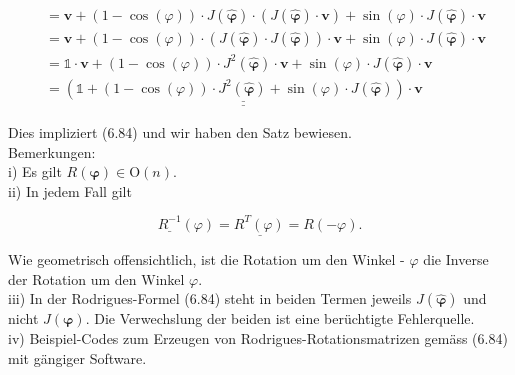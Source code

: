 \documentclass[10pt]{article}
\begin{document}
\begin{align*}
& =\mathbf{v}+(1-\cos (\varphi)) \cdot J(\hat{\boldsymbol{\varphi}}) \cdot(J(\hat{\boldsymbol{\varphi}}) \cdot \mathbf{v})+\sin (\varphi) \cdot J(\hat{\boldsymbol{\varphi}}) \cdot \mathbf{v} \\
& =\mathbf{v}+(1-\cos (\varphi)) \cdot(J(\hat{\boldsymbol{\varphi}}) \cdot J(\hat{\boldsymbol{\varphi}})) \cdot \mathbf{v}+\sin (\varphi) \cdot J(\hat{\boldsymbol{\varphi}}) \cdot \mathbf{v} \\
& =\mathbb{1} \cdot \mathbf{v}+(1-\cos (\varphi)) \cdot J^{2}(\hat{\boldsymbol{\varphi}}) \cdot \mathbf{v}+\sin (\varphi) \cdot J(\hat{\boldsymbol{\varphi}}) \cdot \mathbf{v} \\
& =\underline{\underline{\left(\mathbb{1}+(1-\cos (\varphi)) \cdot J^{2}(\hat{\boldsymbol{\varphi}})+\sin (\varphi) \cdot J(\hat{\boldsymbol{\varphi}})\right) \cdot \mathbf{v}}} \tag{6.87}
\end{align*}


Dies impliziert (6.84) und wir haben den Satz bewiesen.\\
Bemerkungen:\\
i) Es gilt $R(\boldsymbol{\varphi}) \in \mathrm{O}(n)$.\\
ii) In jedem Fall gilt


\begin{equation*}
\underline{\underline{R^{-1}}(\varphi)=R^{T}(\varphi)=R(-\varphi) .} \tag{6.88}
\end{equation*}


Wie geometrisch offensichtlich, ist die Rotation um den Winkel - $\varphi$ die Inverse der Rotation um den Winkel $\varphi$.\\
iii) In der Rodrigues-Formel (6.84) steht in beiden Termen jeweils $J(\hat{\boldsymbol{\varphi}})$ und nicht $J(\boldsymbol{\varphi})$. Die Verwechslung der beiden ist eine berüchtigte Fehlerquelle.\\
iv) Beispiel-Codes zum Erzeugen von Rodrigues-Rotationsmatrizen gemäss (6.84) mit gängiger Software.
\end{document}
